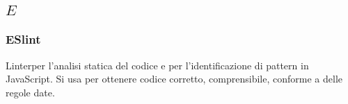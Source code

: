 \subsection*{\quad$E\quad$}


\subsubsection*{ESlint}
Linter\glo per l’analisi statica del codice e per l’identificazione di pattern in JavaScript. Si usa per ottenere codice corretto, comprensibile, conforme a delle regole date.


